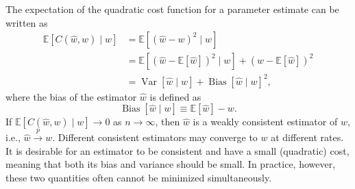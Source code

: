 \begin{theorem}
	\label{theorem:MSE}
	The expectation of the quadratic cost function for a parameter estimate can be written as
	\begin{equation}
		\begin{split}
			\mathbb{E}[C(\hat{w}, w)\mid w] &= \mathbb{E}[(\hat{w}-w)^2\mid w]\\ 
			&= \mathbb{E}[(\hat{w}-\mathbb{E}[\hat{w}])^2\mid w] + (w-\mathbb{E}[\hat{w}])^2\\
			&= \operatorname{Var}[\hat{w}\mid w] + \operatorname{Bias}[\hat{w}\mid w]^2,
		\end{split}
		\label{eq:MSE}
	\end{equation}
	where the bias of the estimator $\hat{w}$ is defined as
	\begin{equation}
		\operatorname{Bias}[\hat{w}\mid w] \equiv \mathbb{E}[\hat{w}] - w.
	\end{equation}
	If $\mathbb{E}[C(\hat{w}, w)\mid w] \to 0$ as $n \to \infty$, then $\hat{w}$ is a weakly consistent estimator of $w$, i.e., $\hat{w} \xrightarrow{p} w$.  
	Different consistent estimators may converge to $w$ at different rates.  
	It is desirable for an estimator to be consistent and have a small (quadratic) cost, meaning that both its bias and variance should be small.  
	In practice, however, these two quantities often cannot be minimized simultaneously.
\end{theorem}

